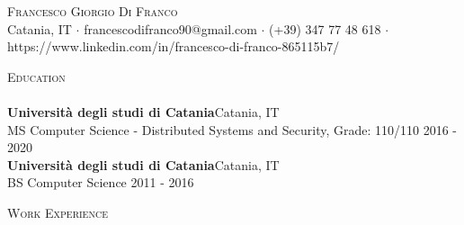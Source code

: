 \documentclass[a4paper]{article}
\newcommand{\lineunder} {
    \vspace*{-8pt} \\
    \hspace*{-18pt} \hrulefill \\
}
\newcommand{\header} [1] {
    {\hspace*{-18pt}\vspace*{6pt} \textsc{#1}}
    \vspace*{-6pt} \lineunder
}
\begin{document}
\vspace*{-40pt}

    

\vspace*{-10pt}
\begin{center}
	{\Huge \scshape {Francesco Giorgio Di Franco}}\\
	Catania, IT $\cdot$ francescodifranco90@gmail.com $\cdot$ (+39) 347 77 48 618 $\cdot$ https://www.linkedin.com/in/francesco-di-franco-865115b7/\\
\end{center}

\header{Education}
\textbf{Università degli studi di Catania}\hfill Catania, IT\\
MS Computer Science - Distributed Systems and Security, Grade: 110/110 \hfill 2016 - 2020\\
\vspace{2mm}
\textbf{Università degli studi di Catania}\hfill Catania, IT\\
BS Computer Science \hfill 2011 - 2016\\
\vspace{2mm}

\header{Work Experience}
\vspace{1mm}
\end{document}
